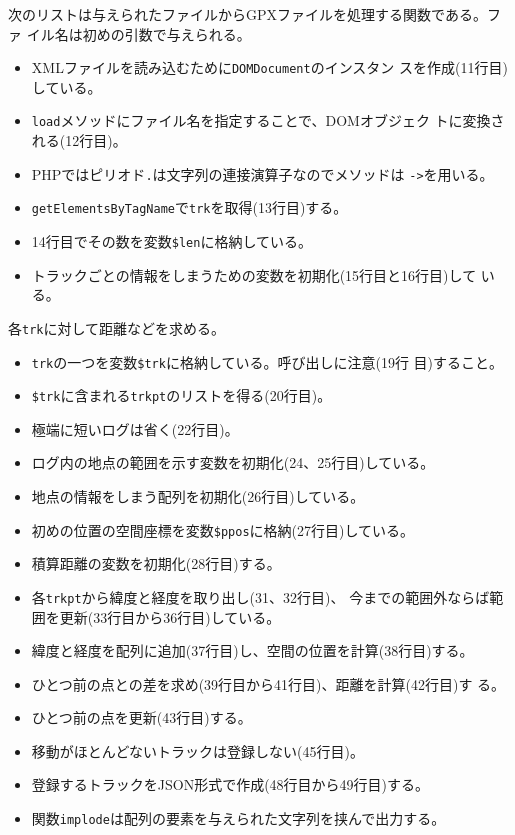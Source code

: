  次のリストは与えられたファイルからGPXファイルを処理する関数である。ファ
 イル名は初めの引数で与えられる。
 \begin{itemize}
  \item XMLファイルを読み込むために\texttt{DOMDocument}のインスタン
        スを作成(11行目)している。
  \item \texttt{load}メソッドにファイル名を指定することで、DOMオブジェク
        トに変換される(12行目)。
  \item PHPではピリオド\texttt{.}は文字列の連接演算子なのでメソッドは
        \texttt{->}を用いる。
  \item \texttt{getElementsByTagName}で\texttt{trk}を取得(13行目)する。
  \item 14行目でその数を変数\texttt{\$len}に格納している。
  \item トラックごとの情報をしまうための変数を初期化(15行目と16行目)して
				いる。
 \end{itemize}
 各\texttt{trk}に対して距離などを求める。
 \begin{itemize}
  \item \texttt{trk}の一つを変数\texttt{\$trk}に格納している。呼び出しに注意(19行
        目)すること。
  \item \texttt{\$trk}に含まれる\texttt{trkpt}のリストを得る(20行目)。
  \item 極端に短いログは省く(22行目)。
  \item ログ内の地点の範囲を示す変数を初期化(24、25行目)している。
  \item 地点の情報をしまう配列を初期化(26行目)している。
  \item 初めの位置の空間座標を変数\texttt{\$ppos}に格納(27行目)している。
  \item 積算距離の変数を初期化(28行目)する。
 \end{itemize}
 \begin{itemize}
  \item 各\texttt{trkpt}から緯度と経度を取り出し(31、32行目)、
  今までの範囲外ならば範囲を更新(33行目から36行目)している。
  \item 緯度と経度を配列に追加(37行目)し、空間の位置を計算(38行目)する。
  \item ひとつ前の点との差を求め(39行目から41行目)、距離を計算(42行目)す
				る。
  \item ひとつ前の点を更新(43行目)する。
 \end{itemize}
 \begin{itemize}
  \item 移動がほとんどないトラックは登録しない(45行目)。
  \item 登録するトラックをJSON形式で作成(48行目から49行目)する。
  \item 関数\texttt{implode}は配列の要素を与えられた文字列を挟んで出力する。
  \end{itemize}
